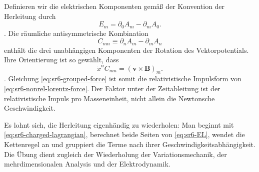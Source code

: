 Definieren wir die elektrischen Komponenten gemäß der Konvention der Herleitung durch \begin{equation}
E_m=\partial_0A_m-\partial_mA_0.
\label{eq:sr6-electric-from-potential}
\end{equation}. Die räumliche antisymmetrische Kombination \begin{equation}
C_{mn}
\equiv
\partial_nA_m-\partial_mA_n
\label{eq:sr6-spatial-curl-tensor}
\end{equation} enthält die drei unabhängigen Komponenten der Rotation des Vektorpotentials. Ihre Orientierung ist so gewählt, dass \begin{equation}
\dot x^nC_{mn}
=
\left(\mathbf v\times\mathbf B\right)_m.
\end{equation}. Gleichung \eqref{eq:sr6-grouped-force} ist somit die relativistische Impulsform von \eqref{eq:sr6-nonrel-lorentz-force}. Der Faktor unter der Zeitableitung ist der relativistische Impuls pro Masseneinheit, nicht allein die Newtonsche Geschwindigkeit.

Es lohnt sich, die Herleitung eigenhändig zu wiederholen: Man beginnt mit \eqref{eq:sr6-charged-lagrangian}, berechnet beide Seiten von \eqref{eq:sr6-EL}, wendet die Kettenregel an und gruppiert die Terme nach ihrer Geschwindigkeitsabhängigkeit. Die Übung dient zugleich der Wiederholung der Variationsmechanik, der mehrdimensionalen Analysis und der Elektrodynamik.

\begin{classroomqa}\end{classroomqa}

\begin{classroomqa}\end{classroomqa}

